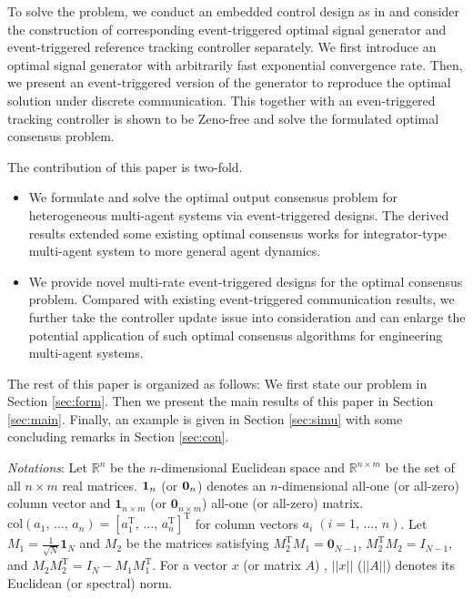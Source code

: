 \documentclass[sort&compress]{IEEEtran}
\renewcommand{\top}{{\mathrm{T}}}
\newcommand{\R}{\mathbb{R}}
\begin{document}
To solve the problem, we conduct an embedded control design as in \cite{tang2019optimal,tang2021optimal} and consider the construction of corresponding event-triggered optimal signal generator and event-triggered reference tracking controller separately.  We first introduce an optimal signal generator with arbitrarily fast exponential convergence rate. Then, we present an event-triggered version of the generator to reproduce the optimal solution under discrete communication. This together with an even-triggered tracking controller is shown to be Zeno-free and solve the formulated optimal consensus problem.  %
 
The contribution of this paper is two-fold.  
\begin{itemize}
	\item We formulate and solve the optimal output consensus problem for heterogeneous multi-agent systems via event-triggered designs.  The derived results extended some existing optimal consensus works for integrator-type  multi-agent system to more general agent dynamics.  
	\item We provide novel multi-rate event-triggered designs for the optimal consensus problem. Compared with existing event-triggered communication results, we further take the controller update issue into consideration and can enlarge the potential application of such optimal consensus algorithms for engineering multi-agent systems.  
\end{itemize}

The rest of this paper is organized as follows:  We first state our problem in Section \ref{sec:form}. Then we present the main results of this paper in Section  \ref{sec:main}. Finally, an example is given in Section \ref{sec:simu} with some concluding remarks in Section \ref{sec:con}. 

{\sl Notations}: Let $\R^n$ be the $n$-dimensional Euclidean space and $\R^{n\times m}$ be the set of all $n\times m$ real matrices. ${\bf 1}_n$ (or ${\bf 0}_n$) denotes an $n$-dimensional all-one (or all-zero) column vector and ${\bm 1}_{n\times m}$ (or ${\bm 0}_{n\times m}$) all-one (or all-zero) matrix.  $\mbox{col}(a_1,\,{\dots},\,a_n) = {[a_1^\top,\,{\dots},\,a_n^\top]}^\top$ for column vectors $a_i\; (i=1,\,{\dots},\,n)$.  Let $M_1=\frac{1}{\sqrt{N}}{\bm 1}_N$ and $M_2$ be the matrices satisfying $M_2^\top M_1={\bm 0}_{N-1}$, $M_2^\top M_2=I_{N-1}$, and $M_2 M_2^\top=I_{N}-M_1 M_1^\top$.   For a vector $x$ (or matrix $A$) , $||x||$ ($||A||$) denotes its Euclidean (or spectral) norm.  
\end{document}
